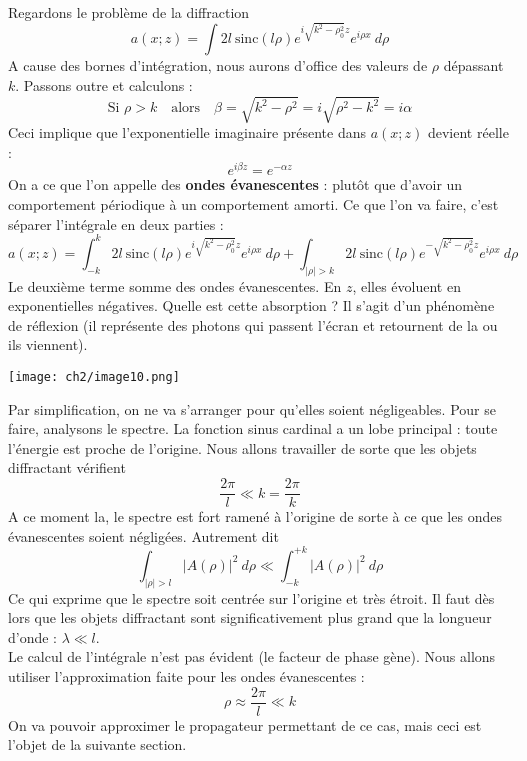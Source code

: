 \begin{enumerate}
Regardons le problème de la diffraction
\begin{equation}
a(x;z) = \int 2l\ \text{sinc}(l\rho)e^{i\sqrt{k^2-\rho_0^2}z}e^{i\rho x}\ d\rho
\end{equation}
A cause des bornes d'intégration, nous aurons d'office des valeurs de $\rho$ dépassant 
$k$. Passons outre et calculons :
\begin{equation}
\text{Si } \rho > k\quad \text{alors}\quad \beta = \sqrt{k^2-\rho^2} = i\sqrt{\rho^2-k^2} = 
i\alpha
\end{equation}
Ceci implique que l'exponentielle imaginaire présente dans $a(x;z)$ devient réelle :
\begin{equation}
e^{i\beta z} = e^{-\alpha z}
\end{equation}
On a ce que l'on appelle des \textbf{ondes évanescentes} : plutôt que d'avoir un comportement 
périodique à un comportement amorti. Ce que l'on va faire, c'est séparer l’intégrale en deux 
parties :
\begin{equation}
a(x;z) = \int_{-k}^k  2l\ \text{sinc}(l\rho)e^{i\sqrt{k^2-\rho_0^2}z}e^{i\rho x}\ d\rho + 
\int_{|\rho|>k}  2l\ \text{sinc}(l\rho)e^{-\sqrt{k^2-\rho_0^2}z}e^{i\rho x}\ d\rho
\end{equation}
Le deuxième terme somme des ondes évanescentes. En $z$, elles évoluent en exponentielles 
négatives. Quelle est cette absorption ? Il s'agit d'un phénomène de réflexion (il représente 
des photons qui passent l'écran et retournent de la ou ils viennent). 

\begin{center}
\texttt{[image: ch2/image10.png]}
\end{center}
Par simplification, 
on ne va s'arranger pour qu'elles soient négligeables. Pour se faire, analysons le spectre. 
La fonction sinus cardinal a un lobe principal : toute l'énergie est proche de l'origine. Nous 
allons travailler de sorte que les objets diffractant vérifient
\begin{equation}
\dfrac{2\pi}{l} \ll k = \dfrac{2\pi}{k}
\end{equation}
A ce moment la, le spectre est fort ramené à l'origine de sorte à ce que les ondes évanescentes 
soient négligées. Autrement dit
\begin{equation}
\int_{|\rho|>l} |A(\rho)|^2\ d\rho \ll \int_{-k}^{+k} |A(\rho)|^2\ d\rho
\end{equation}
Ce qui exprime que le spectre soit centrée sur l'origine et très étroit. Il faut dès lors que 
les objets diffractant sont significativement plus grand que la longueur d'onde : $\lambda \ll l$.\\

Le calcul de l'intégrale n'est pas évident (le facteur de phase gène). Nous allons utiliser 
l'approximation faite pour les ondes évanescentes :
\begin{equation}
\rho \approx \dfrac{2\pi}{l} \ll k
\end{equation}
On va pouvoir approximer le propagateur permettant de  ce cas, mais ceci est l'objet de la 
suivante section.
\end{enumerate}
